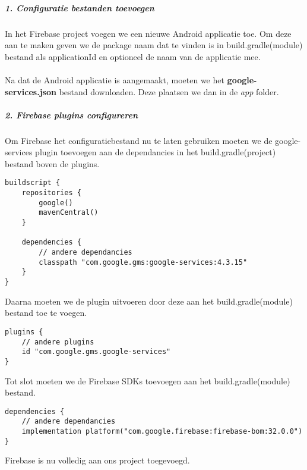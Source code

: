 \subparagraph{1. Configuratie bestanden toevoegen}
In het Firebase project voegen we een nieuwe Android applicatie toe. Om deze aan te maken geven we de package naam 
dat te vinden is in build.gradle(module) bestand als applicationId en optioneel de naam van de applicatie mee.
\\\\
Na dat de Android applicatie is aangemaakt, moeten we het \textbf{google-services.json} bestand downloaden. 
Deze plaatsen we dan in de \textit{app} folder.

\subparagraph{2. Firebase plugins configureren}
Om Firebase het configuratiebestand nu te laten gebruiken moeten we de google-services plugin toevoegen aan 
de dependancies in het build.gradle(project) bestand boven de plugins. 
\begin{verbatim}
buildscript {
    repositories {
        google()
        mavenCentral()
    }

    dependencies {
        // andere dependancies
        classpath "com.google.gms:google-services:4.3.15"
    }
}
\end{verbatim}
Daarna moeten we de plugin uitvoeren door deze aan het build.gradle(module) bestand toe te voegen.
\begin{verbatim}
plugins {
    // andere plugins 
    id "com.google.gms.google-services"
}
\end{verbatim}
Tot slot moeten we de Firebase SDKs toevoegen aan het build.gradle(module) bestand.
\begin{verbatim}
dependencies {
    // andere dependancies
    implementation platform("com.google.firebase:firebase-bom:32.0.0")
}
\end{verbatim}
Firebase is nu volledig aan ons project toegevoegd.